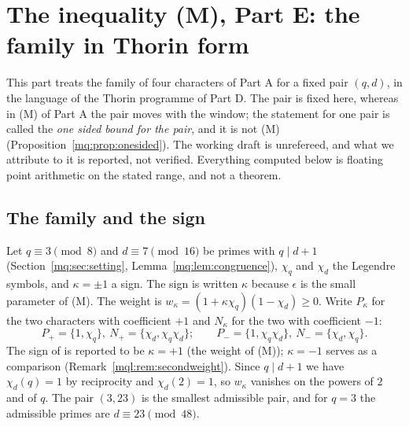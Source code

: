 \section{The inequality (M), Part E: the family in Thorin form}\label{mqf:sec:parte}

This part treats the family of four characters of Part A for a fixed pair $(q,d)$, in the language of the Thorin programme of Part D. The pair is fixed here, whereas in (M) of Part A the pair moves with the window; the statement for one pair is called the \emph{one sided bound for the pair}, and it is not (M) (Proposition~\ref{mq:prop:onesided}). The working draft \cite{Rub26} is unrefereed, and what we attribute to it is reported, not verified. Everything computed below is floating point arithmetic on the stated range, and not a theorem.

\subsection{The family and the sign}\label{mqf:sub:family}

Let $q\equiv3\pmod8$ and $d\equiv7\pmod{16}$ be primes with $q\mid d+1$ (Section~\ref{mq:sec:setting}, Lemma~\ref{mq:lem:congruence}), $\chi_q$ and $\chi_d$ the Legendre symbols, and $\kappa=\pm1$ a sign. The sign is written $\kappa$ because $\epsilon$ is the small parameter of (M). The weight is $w_\kappa=(1+\kappa\chi_q)(1-\chi_d)\ge0$. Write $P_\kappa$ for the two characters with coefficient $+1$ and $N_\kappa$ for the two with coefficient $-1$:
\[
P_+=\{1,\chi_q\},\ N_+=\{\chi_d,\chi_q\chi_d\};\qquad P_-=\{1,\chi_q\chi_d\},\ N_-=\{\chi_d,\chi_q\}.
\]
The sign of \cite{Rub26} is reported to be $\kappa=+1$ (the weight of (M)); $\kappa=-1$ serves as a comparison (Remark~\ref{mql:rem:secondweight}). Since $q\mid d+1$ we have $\chi_d(q)=1$ by reciprocity and $\chi_d(2)=1$, so $w_\kappa$ vanishes on the powers of $2$ and of $q$. The pair $(3,23)$ is the smallest admissible pair, and for $q=3$ the admissible primes are $d\equiv23\pmod{48}$.


